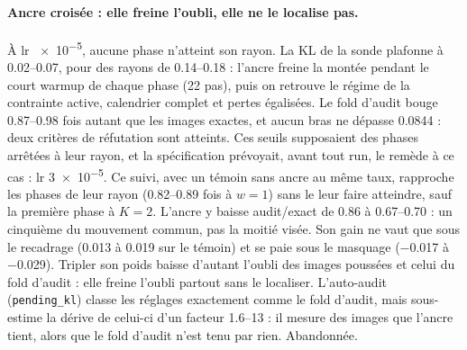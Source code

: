 \documentclass[11pt,a4paper]{article}
\newcommand{\code}[1]{\texttt{#1}}
\begin{document}
\paragraph{Ancre croisée : elle freine l'oubli, elle ne le localise pas.} À lr \num{e-5}, aucune
phase n'atteint son rayon. La KL de la sonde plafonne à \numrange{0.02}{0.07}, pour des rayons de
\numrange{0.14}{0.18} : l'ancre freine la montée pendant le court warmup de chaque phase (22 pas),
puis on retrouve le régime de la contrainte active, calendrier complet et pertes égalisées. Le
fold d'audit bouge \numrange{0.87}{0.98} fois autant que les images exactes, et aucun bras ne dépasse
\num{0.0844} : deux critères de réfutation sont atteints. Ces seuils supposaient des phases arrêtées
à leur rayon, et la spécification prévoyait, avant tout run, le remède à ce cas : lr \num{3e-5}. Ce
suivi, avec un témoin sans ancre au même taux, rapproche les phases de leur rayon (\numrange{0.82}{0.89}
fois à $w=1$) sans le leur faire atteindre, sauf la première phase à $K=2$. L'ancre y baisse audit/exact de \num{0.86} à
\numrange{0.67}{0.70} : un cinquième du mouvement commun, pas la moitié visée. Son gain ne vaut que
sous le recadrage (\num{+0.013} à \num{+0.019} sur le témoin) et se paie sous le masquage
(\num{-0.017} à \num{-0.029}). Tripler son poids baisse d'autant l'oubli des images poussées et
celui du fold d'audit : elle freine l'oubli partout sans le localiser. L'auto-audit
(\code{pending\_kl}) classe les réglages exactement comme le fold d'audit, mais sous-estime la
dérive de celui-ci d'un facteur \numrange{1.6}{13} : il mesure des images que l'ancre tient, alors
que le fold d'audit n'est tenu par rien. Abandonnée.
\end{document}
